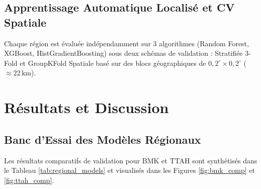 \documentclass[11pt,twocolumn,a4paper]{article}
\begin{document}
\subsection{Apprentissage Automatique Localisé et CV Spatiale}
Chaque région est évaluée indépendamment sur 3 algorithmes (Random Forest, XGBoost, HistGradientBoosting) sous deux schémas de validation : Stratifiée 3-Fold et GroupKFold Spatiale basé sur des blocs géographiques de $0,2^\circ \times 0,2^\circ$ ($\approx 22\,\text{km}$).

\section{Résultats et Discussion}

\subsection{Banc d'Essai des Modèles Régionaux}
Les résultats comparatifs de validation pour BMK et TTAH sont synthétisés dans le Tableau \ref{tab:regional_models} et visualisés dans les Figures \ref{fig:bmk_comp} et \ref{fig:ttah_comp}.

\begin{table}[t]
\centering
\caption{Métriques d'évaluation hors-blocs des modèles régionaux localisés sous validation croisée spatiale par blocs (22 km $\times$ 22 km).}
\label{tab:regional_models}
\end{table}
\end{document}
